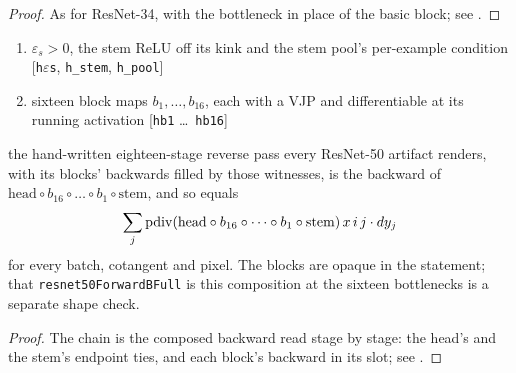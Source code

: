 \begin{proof}
\leanok
As for ResNet-34, with the bottleneck in place of the basic block; see
.
\end{proof}

\begin{theorem}
  \label{thm:resnet50_whole_back}
  \leanok
  \Assume{}
  \begin{enumerate}
    \item \(\varepsilon_s > 0\), the stem ReLU off its kink and the stem pool's
          per-example condition \hfill[\texttt{h\(\varepsilon\)s}, \texttt{h\_stem}, \texttt{h\_pool}]
    \item sixteen block maps \(b_1, \dots, b_{16}\), each with a VJP and
          differentiable at its running activation
          \hfill[\texttt{hb1} \dots\ \texttt{hb16}]
  \end{enumerate}
  \Prove{} the hand-written eighteen-stage reverse pass every ResNet-50
  artifact renders, with its blocks' backwards filled by those witnesses, is
  the backward of
  \(\mathrm{head} \circ b_{16} \circ \dots \circ b_1 \circ \mathrm{stem}\),
  and so equals
  \[
    \sum_j \operatorname{pdiv}(\mathrm{head} \circ b_{16} \circ \dots \circ b_1 \circ \mathrm{stem})\, x\, i\, j
  \cdot dy_j
  \]
  for every batch, cotangent and pixel. The blocks are opaque in the
  statement; that \texttt{resnet50ForwardBFull} is this composition at the
  sixteen bottlenecks is a separate shape check.
\end{theorem}

\begin{proof}
\leanok
The chain is the composed backward read stage by stage: the head's and the
stem's endpoint ties, and each block's backward in its slot; see
.
\end{proof}

